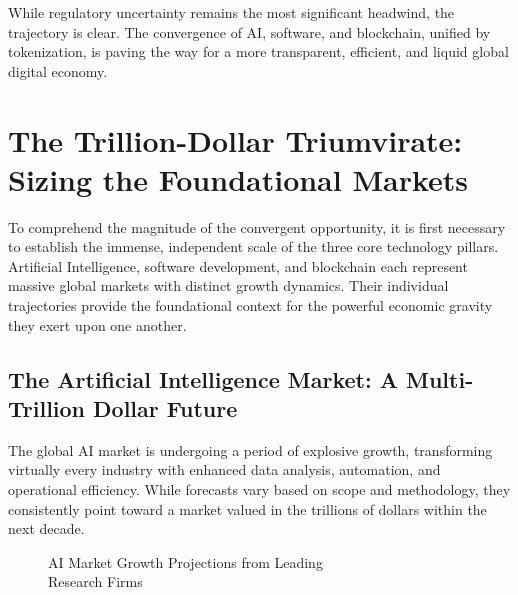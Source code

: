 \documentclass[11pt,a4paper]{report}
\begin{document}
While regulatory uncertainty remains the most significant headwind, the trajectory is clear. The convergence of AI, software, and blockchain, unified by tokenization, is paving the way for a more transparent, efficient, and liquid global digital economy.
\chapter{The Trillion-Dollar Triumvirate: Sizing the Foundational Markets}

To comprehend the magnitude of the convergent opportunity, it is first necessary to establish the immense, independent scale of the three core technology pillars. Artificial Intelligence, software development, and blockchain each represent massive global markets with distinct growth dynamics. Their individual trajectories provide the foundational context for the powerful economic gravity they exert upon one another.

\section{The Artificial Intelligence Market: A Multi-Trillion Dollar Future}

The global AI market is undergoing a period of explosive growth, transforming virtually every industry with enhanced data analysis, automation, and operational efficiency. While forecasts vary based on scope and methodology, they consistently point toward a market valued in the trillions of dollars within the next decade.

\begin{figure}[H]
\centering
{}
\caption{AI Market Growth Projections from Leading\\Research Firms}
\end{figure}
\end{document}
